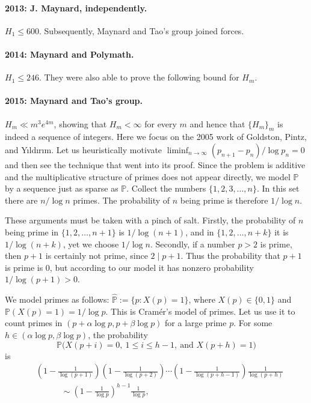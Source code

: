 \documentclass[11pt,a4paper]{article}
\begin{document}
\paragraph{2013: J. Maynard, independently.}
$H_1\le600$. Subsequently, Maynard and Tao's group joined forces.
\paragraph{2014: Maynard and Polymath.}
$H_1\le246$.
They were also able to prove the following bound for $H_m$.
\paragraph{2015: Maynard and Tao's group.}
$H_m\ll m^3e^{4m}$, showing that $H_m<\infty$ for every $m$ and hence that
$\{H_m\}_m$ is indeed a sequence of integers.
Here we focus on the 2005 work of Goldston, Pintz, and Y{\i}ld{\i}r{\i}m.
Let us heuristically motivate $\liminf_{n\to\infty}(p_{n+1}-p_n)/\log p_n=0$
and then see the technique that went into its proof.
Since the problem is additive and the multiplicative structure of primes does not appear directly, we model $\mathbb P$ by a sequence just as
sparse as $\mathbb P$. Collect the numbers $\{1,2,3,\ldots,n\}$.
In this set there are $n/\log n$ primes.
The probability of $n$ being prime is therefore $1/\log n$.
\begin{remark}[Caution]
These arguments must be taken with a pinch of salt.
Firstly, the probability of $n$ being prime in $\{1,2,\ldots,n+1\}$ is
$1/\log(n+1)$, and in $\{1,2,\ldots,n+k\}$ it is $1/\log(n+k)$,
yet we choose $1/\log n$.
Secondly, if a number $p>2$ is prime, then $p+1$ is certainly not prime,
since $2\mid p+1$. Thus the probability that $p+1$ is prime is $0$,
but according to our model it has nonzero probability $1/\log(p+1)>0$.
\end{remark}
We model primes as follows:
$\widehat{\mathbb P}:=\{p:X(p)=1\}$, where $X(p)\in\{0,1\}$ and
$\mathbb P(X(p)=1)=1/\log p$.
This is Cram\'er's model of primes.
Let us use it to count primes in $(p+\alpha\log p,p+\beta\log p)$ for a
large prime $p$. For some $h\in(\alpha\log p,\beta\log p)$, the probability
\[
 \mathbb P\bigl(X(p+i)=0,\ 1\le i\le h-1,\ \text{and }X(p+h)=1\bigr)
\]
is
\[
 \begin{aligned}
 &\left(1-\frac1{\log(p+1)}\right)
 \left(1-\frac1{\log(p+2)}\right)\cdots
 \left(1-\frac1{\log(p+h-1)}\right)\frac1{\log(p+h)}\\
 &\hspace{3em}\sim
 \left(1-\frac1{\log p}\right)^{h-1}\frac1{\log p},
 \end{aligned}
\]
\end{document}
